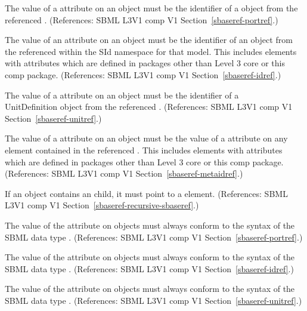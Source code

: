 \begin{sbmlenum}
 { The value of a  attribute on an \SBaseRef
  object must be the identifier of a \Port object from the referenced
  \Model.  
  (References: SBML L3V1 comp V1 Section~\ref{sbaseref-portref}.) }


 { The value of an  attribute on an \SBaseRef
  object must be the identifier of an object from the referenced \Model
  within the SId namespace for that model.  This includes elements with
   attributes which are defined in packages other than Level 3 core or
  this comp package. 
  (References: SBML L3V1 comp V1 Section~\ref{sbaseref-idref}.) }


 { The value of a  attribute on an \SBaseRef
  object must be the identifier of a \\UnitDefinition object from the
  referenced \Model.  
  (References: SBML L3V1 comp V1 Section~\ref{sbaseref-unitref}.) }


 { The value of a  attribute on an \SBaseRef
  object must be the value of a  attribute on any element
  contained in the referenced \Model.  This includes elements with 
  attributes which are defined in packages other than Level 3 core or
  this comp package. 
  (References: SBML L3V1 comp V1 Section~\ref{sbaseref-metaidref}.) }


 { If an \SBaseRef object contains an \SBaseRef child,
  it must point to a \Submodel element. 
  (References: SBML L3V1 comp V1 Section~\ref{sbaseref-recursive-sbaseref}.) }


 { The value of the  attribute 
  on \SBaseRef objects must always conform to the syntax of
  the SBML data type .
  (References: SBML L3V1 comp V1 Section~\ref{sbaseref-portref}.) }


 { The value of the 
  attribute on \SBaseRef objects must always conform to the syntax of
  the SBML data type .
  (References: SBML L3V1 comp V1 Section~\ref{sbaseref-idref}.) }


 { The value of the  attribute on
  \SBaseRef objects must always conform to the syntax of the SBML data
  type .
  (References: SBML L3V1 comp V1 Section~\ref{sbaseref-unitref}.) }



\end{sbmlenum}
